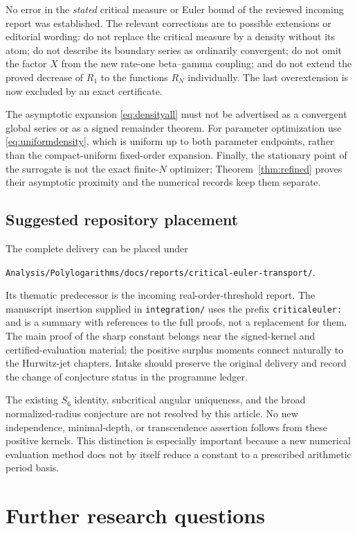\documentclass[11pt]{article}
\numberwithin{equation}{section}
\theoremstyle{definition}\newtheorem{definition}[theorem]{Definition}
\theoremstyle{remark}\newtheorem{remark}[theorem]{Remark}
\begin{document}
No error in the \emph{stated} critical measure or Euler bound of the
reviewed incoming report was established. The relevant corrections are
to possible extensions or editorial wording: do not replace the
critical measure by a density without its atom; do not describe its
boundary series as ordinarily convergent; do not omit the factor $X$
from the new rate-one beta--gamma coupling; and do not extend the
proved decrease of $R_1$ to the functions $R_N$ individually.
The last overextension is now excluded by an exact certificate.

The asymptotic expansion \eqref{eq:densityall} must not be advertised as
a convergent global series or as a signed remainder theorem. For
parameter optimization use \eqref{eq:uniformdensity}, which is uniform
up to both parameter endpoints, rather than the compact-uniform
fixed-order expansion. Finally, the stationary point of the surrogate
is not the exact finite-$N$ optimizer; Theorem~\ref{thm:refined} proves
their asymptotic proximity and the numerical records keep them separate.

\subsection{Suggested repository placement}
The complete delivery can be placed under
\begin{center}\small
\nolinkurl{Analysis/Polylogarithms/docs/reports/critical-euler-transport/}.
\end{center}
Its thematic predecessor is the incoming real-order-threshold report.
The manuscript insertion supplied in \texttt{integration/} uses the
prefix \texttt{criticaleuler:} and is a summary with references to the
full proofs, not a replacement for them. The main proof of the sharp
constant belongs near the signed-kernel and certified-evaluation
material; the positive surplus moments connect naturally to the
Hurwitz-jet chapters. Intake should preserve the original delivery and
record the change of conjecture status in the programme ledger.

The existing $S_6$ identity, subcritical angular uniqueness, and the
broad normalized-radius conjecture are not resolved by this article.
No new independence, minimal-depth, or transcendence assertion follows
from these positive kernels. This distinction is especially important
because a new numerical evaluation method does not by itself reduce a
constant to a prescribed arithmetic period basis.

\section{Further research questions}
\label{sec:future}
\end{document}
